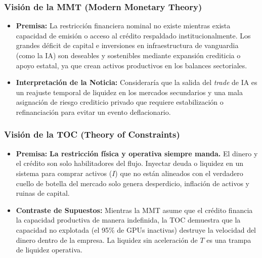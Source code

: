 \documentclass[12pt,letterpaper]{article}
\providecommand{\tightlist}{%
  \setlength{\itemsep}{0pt}\setlength{\parskip}{0pt}}
\begin{document}
\hypertarget{visiuxf3n-de-la-mmt-modern-monetary-theory}{%
\subsubsection{Visión de la MMT (Modern Monetary
Theory)}\label{visiuxf3n-de-la-mmt-modern-monetary-theory}}

\begin{itemize}
\tightlist
\item
  \textbf{Premisa:} La restricción financiera nominal no existe mientras
  exista capacidad de emisión o acceso al crédito respaldado
  institucionalmente. Los grandes déficit de capital e inversiones en
  infraestructura de vanguardia (como la IA) son deseables y sostenibles
  mediante expansión crediticia o apoyo estatal, ya que crean activos
  productivos en los balances sectoriales.
\item
  \textbf{Interpretación de la Noticia:} Consideraría que la salida del
  \emph{trade} de IA es un reajuste temporal de liquidez en los mercados
  secundarios y una mala asignación de riesgo crediticio privado que
  requiere estabilización o refinanciación para evitar un evento
  deflacionario.
\end{itemize}

\hypertarget{visiuxf3n-de-la-toc-theory-of-constraints}{%
\subsubsection{Visión de la TOC (Theory of
Constraints)}\label{visiuxf3n-de-la-toc-theory-of-constraints}}

\begin{itemize}
\tightlist
\item
  \textbf{Premisa:} \textbf{La restricción física y operativa siempre
  manda.} El dinero y el crédito son solo habilitadores del flujo.
  Inyectar deuda o liquidez en un sistema para comprar activos (\(I\))
  que no están alineados con el verdadero cuello de botella del mercado
  solo genera desperdicio, inflación de activos y ruinas de capital.
\item
  \textbf{Contraste de Supuestos:} Mientras la MMT asume que el crédito
  financia la capacidad productiva de manera indefinida, la TOC
  demuestra que la capacidad no explotada (el 95\% de GPUs inactivas)
  destruye la velocidad del dinero dentro de la empresa. La liquidez sin
  aceleración de \(T\) es una trampa de liquidez operativa.
\end{itemize}
\end{document}
